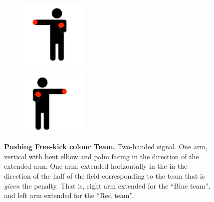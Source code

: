         \begin{figure}[ht!]
            \centering
            \begin{subfigure}{.33\textwidth}
                \includegraphics[height=120px]{figs/referee-signals/pushing.png}
            \end{subfigure}
            \begin{subfigure}{.33\textwidth}
                \includegraphics[height=120px]{figs/referee-signals/pushing-flipped.png}
            \end{subfigure}
            \caption{\textbf{Pushing Free-kick \textlangle{}colour\textrangle{}  Team.}
            Two-handed signal. One arm, vertical with bent elbow and palm facing in the direction of the extended arm. One arm, extended horizontally in the in the direction of the half of the field corresponding to the team that is \emph{given} the penalty. That is, right arm extended for the ``Blue team'', and left arm extended for the ``Red team''.}
        \end{figure}

